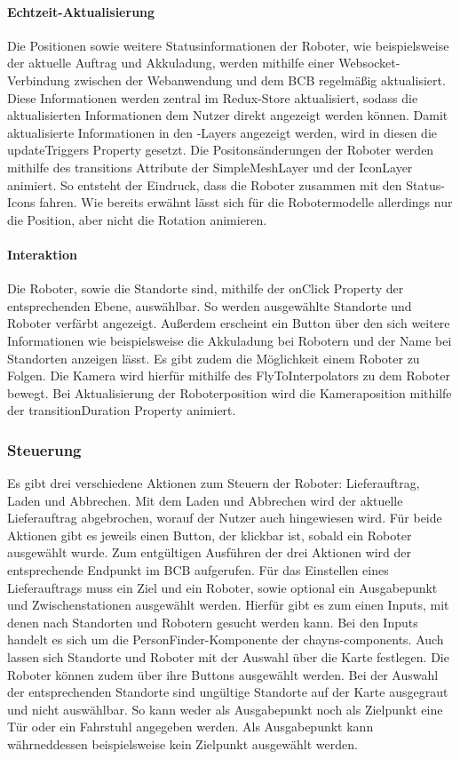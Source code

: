 \paragraph{Echtzeit-Aktualisierung}
Die Positionen sowie weitere Statusinformationen der Roboter, wie beispielsweise der aktuelle Auftrag und Akkuladung, werden mithilfe einer \gls{Websocket}-Verbindung zwischen der Webanwendung und dem \ac{BCB} regelmäßig aktualisiert. Diese Informationen werden zentral im Redux-Store aktualisiert, sodass die aktualisierten Informationen dem Nutzer direkt angezeigt werden können. Damit aktualisierte Informationen in den \deckgl{}-Layers angezeigt werden, wird in diesen die updateTriggers Property gesetzt.
Die Positonsänderungen der Roboter werden mithilfe des transitions Attribute der SimpleMeshLayer und der IconLayer animiert. So entsteht der Eindruck, dass die Roboter zusammen mit den Status-Icons fahren. Wie bereits erwähnt lässt sich für die Robotermodelle allerdings nur die Position, aber nicht die Rotation animieren.

\paragraph{Interaktion}
Die Roboter, sowie die Standorte sind, mithilfe der onClick Property der entsprechenden Ebene, auswählbar. So werden ausgewählte Standorte und Roboter verfärbt angezeigt. Außerdem erscheint ein Button über den sich weitere Informationen wie beispielsweise die Akkuladung bei Robotern und der Name bei Standorten anzeigen lässt. Es gibt zudem die Möglichkeit einem Roboter zu Folgen. Die Kamera wird hierfür mithilfe des FlyToInterpolators zu dem Roboter bewegt. 
Bei Aktualisierung der Roboterposition wird die Kameraposition mithilfe der transitionDuration Property animiert.


\subsubsection{Steuerung}
Es gibt drei verschiedene Aktionen zum Steuern der Roboter: Lieferauftrag, Laden und Abbrechen. Mit dem Laden und Abbrechen wird der aktuelle Lieferauftrag abgebrochen, worauf der Nutzer auch hingewiesen wird. Für beide Aktionen gibt es jeweils einen Button, der klickbar ist, sobald ein Roboter ausgewählt wurde. Zum entgültigen Ausführen der drei Aktionen wird der entsprechende Endpunkt im \ac{BCB} aufgerufen. Für das Einstellen eines Lieferauftrags muss ein Ziel und ein Roboter, sowie optional ein Ausgabepunkt und Zwischenstationen ausgewählt werden. Hierfür gibt es zum einen Inputs, mit denen nach Standorten und Robotern gesucht werden kann. Bei den Inputs handelt es sich um die PersonFinder-Komponente der chayns-components. Auch lassen sich Standorte und Roboter mit der Auswahl über die Karte festlegen. Die Roboter können zudem über ihre Buttons ausgewählt werden. Bei der Auswahl der entsprechenden Standorte sind ungültige Standorte auf der Karte ausgegraut und nicht auswählbar. So kann weder als Ausgabepunkt noch als Zielpunkt eine Tür oder ein Fahrstuhl angegeben werden. Als Ausgabepunkt kann währneddessen beispielsweise kein Zielpunkt ausgewählt werden.


